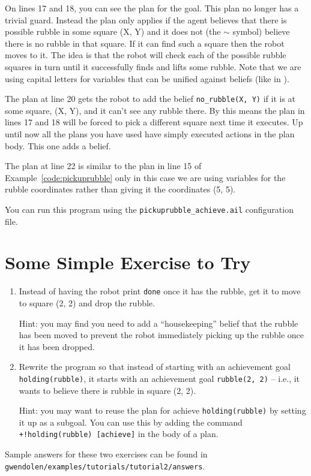 On lines 17 and 18, you can see the plan for the
goal.  This plan no longer has a trivial
guard.  Instead the plan only applies if the agent
believes that there is possible rubble in some square
(X, Y) and it does not (the $\sim$ symbol) believe there is no rubble in that square.  If it can find such a
square then the robot moves to it.  The idea is that the
robot will check each of the possible rubble squares in turn until it
successfully finds and lifts some rubble.  Note that we are using
capital letters for variables that can be
unified against beliefs (like in \prolog).

The plan at line 20 gets the robot to add the
belief \lstinline{no_rubble(X, Y)} if it is at some
square, (X, Y), and it can't see any rubble there.  By this means the
plan in lines 17 and 18 will be forced to pick a different square next
time it executes.  Up until now all the plans you have used have
simply executed actions in the plan body.  This one adds a
belief.

The plan at line 22 is similar to the plan in line 15 of
Example~\ref{code:pickuprubble} only in this case we are using
variables for the rubble coordinates rather than giving it the
coordinates (5, 5).

You can run this program using the \lstinline{pickuprubble_achieve.ail} configuration file.

\section{Some Simple Exercise to Try}
\begin{enumerate}
\item Instead of having the robot print \lstinline{done} once it has
  the rubble, get it to move to square (2, 2) and drop the rubble.

Hint: you may find you need to add a ``housekeeping'' belief that the
rubble has been moved to prevent the robot immediately picking up the
rubble once it has been dropped.
\item Rewrite the program so that instead of starting with an
  achievement goal \lstinline{holding(rubble)}, it starts with an
  achievement goal \lstinline{rubble(2, 2)} -- i.e., it wants to
  believe there is rubble in square (2, 2).

Hint: you may want to reuse the plan for achieve
\lstinline{holding(rubble)} by setting it up as a
subgoal.  You can use this by adding
the command \lstinline{+!holding(rubble) [achieve]} in the body of a
plan.
\end{enumerate}
\begin{sloppypar}
Sample answers for these two exercises can be found in \texttt{gwendolen/examples/tutorials/tutorial2/answers}.
\end{sloppypar}


